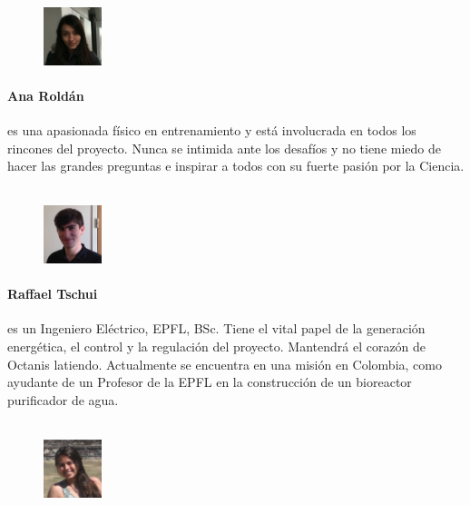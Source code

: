 \documentclass[a4paper,12pt]{article}
\begin{document}
\begin{figure}
    \centering
    \vspace{-13pt}
    \includegraphics[width=0.15\textwidth]{ana}
\end{figure}
\paragraph{Ana Roldán} es una apasionada físico en entrenamiento y está involucrada en todos los rincones del proyecto. Nunca se intimida ante los desafíos  y no tiene miedo de hacer las grandes preguntas e inspirar a todos con su fuerte pasión por la Ciencia.
\\ \\

\begin{figure}
     \centering
     \vspace{-13pt}
    \includegraphics[width=0.15\textwidth]{raf}
\end{figure} 
\paragraph{Raffael Tschui} es un Ingeniero Eléctrico, EPFL, BSc. Tiene el vital papel de la generación energética, el control y la regulación del proyecto. Mantendrá el corazón de Octanis latiendo. Actualmente se encuentra en una misión en Colombia, como ayudante de un Profesor de la EPFL en la construcción de un bioreactor purificador de agua.
\\ \\

\begin{figure}
    \centering
    \vspace{-13pt}
    \includegraphics[width=0.15\textwidth]{pam}
\end{figure} 
\end{document}
